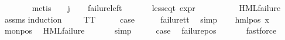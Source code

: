 \begin{isabellebody}
\ \ \ \ \ \ \isamarkupfalse%
\ {\isacharparenleft}{\kern0pt}metis\ {\isacartoucheopen}{\isasympsi}\ {\isacharequal}{\kern0pt}\ {\isasymPhi}\ j{\isacartoucheclose}{\isacharparenright}{\kern0pt}\isanewline
\ \ \isamarkupfalse%
\isanewline
{}\isamarkupfalse%
%
\endisatagproof
{\isafoldproof}%
%
\isadelimproof
\isanewline
%
\endisadelimproof
\isanewline
{}\isamarkupfalse%
\ failure{\isacharunderscore}{\kern0pt}left{\isacharcolon}{\kern0pt}\isanewline
\ \ \ {\isasymphi}\isanewline
\ \ \ {\isachardoublequoteopen}{\isacharparenleft}{\kern0pt}less{\isacharunderscore}{\kern0pt}eq{\isacharunderscore}{\kern0pt}t\ {\isacharparenleft}{\kern0pt}expr\ {\isasymphi}{\isacharparenright}{\kern0pt}\ {\isacharparenleft}{\kern0pt}{\isasyminfinity}{\isacharcomma}{\kern0pt}\ {}{\isacharcomma}{\kern0pt}\ {}{\isacharcomma}{\kern0pt}\ {}{\isacharcomma}{\kern0pt}\ {}{\isacharcomma}{\kern0pt}\ {}{\isacharparenright}{\kern0pt}{\isacharparenright}{\kern0pt}{\isachardoublequoteclose}\isanewline
\ \ \ {\isachardoublequoteopen}HML{\isacharunderscore}{\kern0pt}failure\ {\isasymphi}{\isachardoublequoteclose}\isanewline
%
\isadelimproof
\ \ %
\endisadelimproof
%
\isatagproof
{}\isamarkupfalse%
\ assms\isanewline
{}\isamarkupfalse%
{\isacharparenleft}{\kern0pt}induction\ {\isasymphi}{\isacharparenright}{\kern0pt}\isanewline
\ \ \isamarkupfalse%
\ TT\isanewline
\ \ \isamarkupfalse%
\ \isamarkupfalse%
\ {\isacharquery}{\kern0pt}case\isanewline
\ \ \ \ \isamarkupfalse%
\ failure{\isacharunderscore}{\kern0pt}tt\ \isamarkupfalse%
\ simp\isanewline
{}\isamarkupfalse%
\isanewline
\ \ \isamarkupfalse%
\ {\isacharparenleft}{\kern0pt}hml{\isacharunderscore}{\kern0pt}pos\ x{}\ {\isasymphi}{\isacharparenright}{\kern0pt}\isanewline
\ \ \isamarkupfalse%
\ mon{\isacharunderscore}{\kern0pt}pos\ \isamarkupfalse%
\ {\isachardoublequoteopen}HML{\isacharunderscore}{\kern0pt}failure\ {\isasymphi}{\isachardoublequoteclose}\isanewline
\ \ \ \ \isamarkupfalse%
\ simp\isanewline
\ \ \isamarkupfalse%
\ \isamarkupfalse%
\ {\isacharquery}{\kern0pt}case\ \isamarkupfalse%
\ failure{\isacharunderscore}{\kern0pt}pos\ \isanewline
\ \ \ \ \isamarkupfalse%
\ fastforce\isanewline
{}\isamarkupfalse%

\end{isabellebody}
